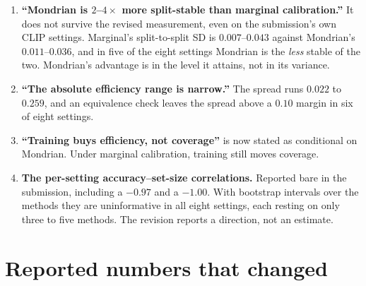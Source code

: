 \documentclass[11pt,a4paper]{article}
\begin{document}
\begin{enumerate}[leftmargin=1.5em,itemsep=0.4em]
\item \textbf{``Mondrian is $2$--$4\times$ more split-stable than marginal calibration.''} It does not
survive the revised measurement, even on the submission's own CLIP settings. Marginal's split-to-split SD is
$0.007$--$0.043$ against Mondrian's $0.011$--$0.036$, and in five of the eight settings
Mondrian is the \emph{less} stable of the two. Mondrian's advantage is in the level it attains, not
in its variance.
\item \textbf{``The absolute efficiency range is narrow.''} The spread runs $0.022$ to $0.259$, and
an equivalence check leaves the spread above a $0.10$ margin in six of eight settings.
\item \textbf{``Training buys efficiency, not coverage''} is now stated as conditional on Mondrian.
Under marginal calibration, training still moves coverage.
\item \textbf{The per-setting accuracy--set-size correlations.} Reported bare in the submission,
including a $-0.97$ and a $-1.00$. With bootstrap intervals over the methods they are
uninformative in all eight settings, each resting on only three to five methods. The revision reports a direction, not
an estimate.
\end{enumerate}

\section{Reported numbers that changed}
\label{sec:numbers}
\end{document}
